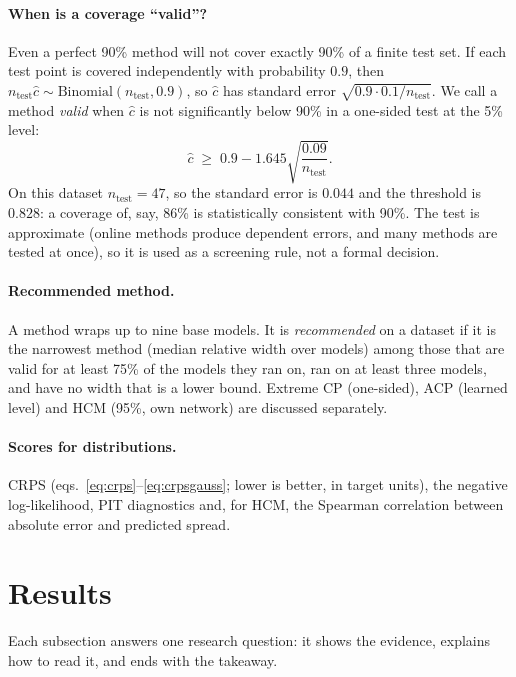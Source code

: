 \documentclass[11pt]{article}
\begin{document}
\paragraph{When is a coverage ``valid''?} Even a perfect 90\% method will not cover exactly 90\% of a finite test set. If each test
point is covered independently with probability $0.9$, then $n_{\text{test}}\hat c\sim\mathrm{Binomial}(n_{\text{test}},0.9)$, so
$\hat c$ has standard error $\sqrt{0.9\cdot0.1/n_{\text{test}}}$. We call a method \emph{valid} when $\hat c$ is not significantly
below 90\% in a one-sided test at the 5\% level:
\begin{equation}\label{eq:valid}
\hat c\;\ge\;0.9-1.645\sqrt{\frac{0.09}{n_{\text{test}}}} .
\end{equation}
On this dataset $n_{\text{test}}=47$, so the standard error is $0.044$ and the threshold is
$0.828$: a coverage of, say, 86\% is statistically consistent with 90\%.
The test is approximate (online methods produce dependent errors, and many methods are tested at once), so it is used as a
screening rule, not a formal decision.

\paragraph{Recommended method.} A method wraps up to nine base models. It is \emph{recommended} on a dataset if it is the
narrowest method (median relative width over models) among those that are valid for at least 75\% of the models they ran on,
ran on at least three models, and have no width that is a lower bound. Extreme CP (one-sided), ACP (learned level) and HCM (95\%,
own network) are discussed separately.

\paragraph{Scores for distributions.} CRPS (eqs.~\ref{eq:crps}--\ref{eq:crpsgauss}; lower is better, in target units), the negative
log-likelihood, PIT diagnostics and, for HCM, the Spearman correlation between absolute error and predicted spread.

\section{Results}\label{sec:results}
Each subsection answers one research question: it shows the evidence, explains how to read it, and ends with the takeaway.
\end{document}
